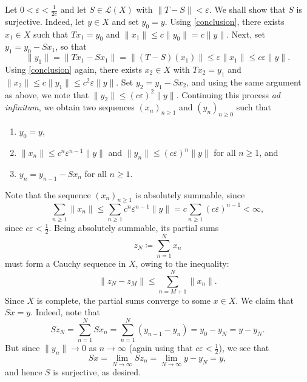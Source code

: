 \documentclass[11pt]{article}
\theoremstyle{thmstyle}
\theoremstyle{defstyle}
\renewcommand{\le}{\leqslant}
\renewcommand{\ge}{\geqslant}
\begin{document}
Let $0 < \varepsilon < \frac{1}{2c}$ and let $S\in\mathscr L(X)$ with $\|T - S\| < \varepsilon$. We shall show that $S$ is surjective. Indeed, let $y\in X$ and set $y_0 = y$. Using \eqref{conclusion}, there exists $x_1\in X$ such that $Tx_1 = y_0$ and $\|x_1\|\le c\|y_0\| = c\|y\|$. Next, set $y_1 = y_0 - Sx_1$, so that 
\begin{equation*}
    \|y_1\| = \left\|Tx_1 - Sx_1\right\| = \left\|(T - S)(x_1)\right\|\le \varepsilon\|x_1\|\le c\varepsilon\|y\|.
\end{equation*}
Using \eqref{conclusion} again, there exists $x_2\in X$ with $Tx_2 = y_1$ and $\|x_2\|\le c\|y_1\|\le c^2\varepsilon \|y\|$. Set $y_2 = y_1 - Sx_2$, and using the same argument as above, we note that $\|y_2\|\le (c\varepsilon)^2 \|y\|$. Continuing this process \emph{ad infinitum}, we obtain two sequences $(x_n)_{n\ge 1}$ and $(y_n)_{n\ge 0}$ such that 
\begin{enumerate}[label=(\roman*)]
    \item $y_0 = y$,
    \item $\|x_n\|\le c^n\varepsilon^{n - 1}\|y\|$ and $\|y_n\|\le (c\varepsilon)^n \|y\|$ for all $n\ge 1$, and 
    \item $y_n = y_{n - 1} - Sx_n$ for all $n\ge 1$.
\end{enumerate}
Note that the sequence $(x_n)_{n\ge 1}$ is absolutely summable, since 
\begin{equation*}
    \sum_{n\ge 1}\|x_n\|\le \sum_{n\ge 1}c^n\varepsilon^{n - 1}\|y\| = c\sum_{n\ge 1}(c\varepsilon)^{n - 1} < \infty,
\end{equation*}
since $c\varepsilon < \frac{1}{2}$. Being absolutely summable, its partial sums 
\begin{equation*}
    z_N\coloneq\sum_{n = 1}^N x_n
\end{equation*}
must form a Cauchy sequence in $X$, owing to the inequality: 
\begin{equation*}
    \|z_N - z_M\|\le\sum_{n = M + 1}^N \|x_n\|.
\end{equation*}
Since $X$ is complete, the partial sums converge to some $x\in X$. We claim that $Sx = y$. Indeed, note that 
\begin{equation*}
    Sz_N = \sum_{n = 1}^N Sx_n = \sum_{n = 1}^N (y_{n - 1} - y_n) = y_0 - y_N = y - y_N.
\end{equation*}
But since $\|y_n\|\to 0$ as $n\to\infty$ (again using that $c\varepsilon < \frac{1}{2}$), we see that 
\begin{equation*}
    Sx = \lim_{N\to\infty} Sz_n = \lim_{N\to\infty} y - y_N = y,
\end{equation*}
and hence $S$ is surjective, as desired.
\end{document}
